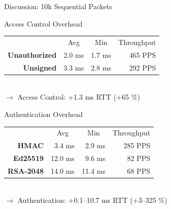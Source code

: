 \documentclass[en]{sdqbeamer}
\begin{document}
\begin{frame}{Discussion: 10k Sequential Packets}
    \begin{blueblock}{Access Control Overhead}
        \begin{tabular}{r r r r}
            & \multicolumn{1}{c}{Avg} & \multicolumn{1}{c}{Min} & \multicolumn{1}{c}{Throughput}\\
            \textbf{Unauthorized} & 2.0 ms & 1.7 ms & 465 PPS\\
            \textbf{Unsigned} & 3.3 ms & 2.8 ms & 292 PPS
        \end{tabular}
        \vspace{0.5em}
        \\$\rightarrow$ Access Control: +1.3 ms RTT (+65 \%)
    \end{blueblock}
    \begin{blueblock}{Authentication Overhead}
        \begin{tabular}{r r r r}
            & \multicolumn{1}{c}{Avg} & \multicolumn{1}{c}{Min} & \multicolumn{1}{c}{Throughput}\\
            \textbf{HMAC} & 3.4 ms & 2.9 ms & 285 PPS\\
            \textbf{Ed25519} & 12.0 ms & 9.6 ms & 82 PPS\\
            \textbf{RSA-2048} & 14.0 ms & 11.4 ms & 68 PPS
        \end{tabular}
        \vspace{0.5em}
        \\$\rightarrow$ Authentication: +0.1--10.7 ms RTT (+3--325 \%)
    \end{blueblock}
\end{frame}
\end{document}
